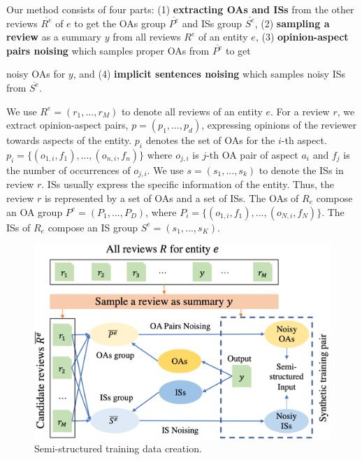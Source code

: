 Our method consists of four parts: 
(1) \textbf{extracting OAs and ISs} from the other reviews $\overline{R^e}$ of $e$ to get the OAs group $\overline{P^e}$
and ISs group $\overline{S^e}$,
(2) \textbf{sampling a review} as a summary $y$ from all reviews $R^e$ of an entity $e$, 
(3) {\bf opinion-aspect pairs noising} which samples proper OAs from $\overline{P^e}$ to get {noisy OAs for $y$,
and (4) {\bf implicit sentences noising} which samples noisy ISs from $\overline{S^e}$. 

We use $R^e=(r_1,...,r_M)$ to denote all reviews of an entity $e$. 
For a review $r$, we extract opinion-aspect pairs, 
$p=(p_{1},...,p_{d})$, 
expressing opinions of the reviewer towards aspects of the entity.
$p_i$ denotes the set of OAs for the $i$-th aspect.
$p_{i}=\{(o_{1,i}, f_1), ..., (o_{n,i}, f_n)\}$ where %
$o_{j,i}$ is $j$-th OA pair of aspect $a_i$ 
and $f_j$ is the number of occurrences of $o_{j,i}$.
We use $s=(s_1,..., s_k)$ to denote the  ISs in review $r$. ISs usually express the specific information of the entity.
Thus, the review $r$ is represented by a set of OAs and a set of ISs.
The OAs of $R_e$ compose an OA group $P^e=(P_{1},...,P_{D})$, 
where $P_{i}=\{(o_{1,i},f_1), ..., (o_{N, i},f_N)\}$.
The ISs of $R_e$ compose an IS group $S^e=(s_1,..., s_K)$. 




\begin{figure}[th]
	\centering
	\includegraphics[width=0.9\linewidth]{./dm.pdf}
	\caption{Semi-structured training data creation.}
	\label{fig:dm}
\end{figure}

}
